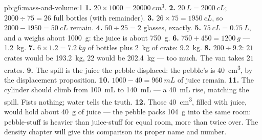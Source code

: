 \begin{solution}{pb:g6:mass-and-volume:1}
\textbf{1.} $20 \times 1000 = \qty{20000}{cm^3}$.
\textbf{2.} $\qty{20}{L} = \qty{2000}{cL}$; $2000 \div 75 = 26$
full bottles (with remainder).
\textbf{3.} $26 \times 75 = \qty{1950}{cL}$, so $2000 - 1950 =
\qty{50}{cL}$ remain.
\textbf{4.} $50 \div 25 = 2$ glasses, exactly.
\textbf{5.} $\qty{75}{cL} = \qty{0.75}{L}$, and a  weighs
about \qty{1000}{g}: the juice is about \qty{750}{g}.
\textbf{6.} $750 + 450 = \qty{1200}{g}$ --- \qty{1.2}{kg}.
\textbf{7.} $6 \times 1.2 = \qty{7.2}{kg}$ of bottles plus
\qty{2}{kg} of crate: \qty{9.2}{kg}.
\textbf{8.} $200 \div 9.2$: $21$ crates would be
\qty{193.2}{kg}, $22$ would be \qty{202.4}{kg} --- too much. The
van takes $21$ crates.
\textbf{9.} The spill is the juice the pebble displaced: the
pebble's  is \qty{40}{cm^3}, by the displacement
proposition.
\textbf{10.} $1000 - 40 = \qty{960}{mL}$ of juice remain.
\textbf{11.} The cylinder should climb from \qty{100}{mL} to
\qty{140}{mL} --- a \qty{40}{mL} rise, matching the spill. Fists
 nothing; water tells the truth.
\textbf{12.} Those \qty{40}{cm^3}, filled with juice, would hold
about \qty{40}{g} of juice --- the pebble packs \qty{104}{g} into
the same room: pebble-stuff is heavier than juice-stuff for equal
room, more than twice over. The density chapter will give this
comparison its proper name and number.
\end{solution}
